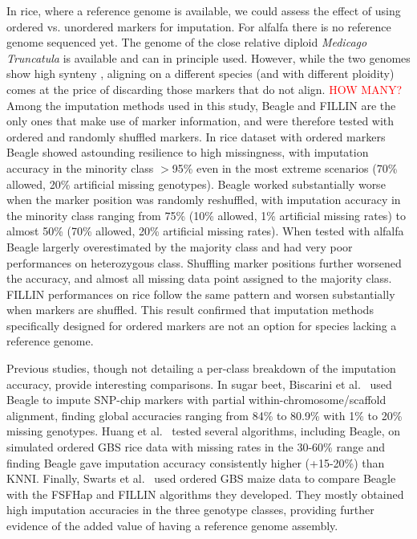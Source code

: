 In rice, where a reference genome is available, we could assess the effect of using ordered vs. unordered markers for imputation. For alfalfa there is no reference genome sequenced yet. The genome of the close relative diploid \emph{Medicago Truncatula} is available \cite{young_medicago_2011} and can in principle used. However, while the two genomes show high synteny \cite{li_saturated_2014}, aligning on a different species (and with different ploidity) comes at the price of discarding those markers that do not align. \textcolor{red}{HOW MANY?}\\

Among the imputation methods used in this study, Beagle and FILLIN are the only ones that make use of marker information, and were therefore tested with ordered and randomly shuffled markers. In rice dataset with ordered markers Beagle showed astounding resilience to high missingness, with imputation accuracy in the minority class $>$95\% even in the most extreme scenarios (70\% allowed, 20\% artificial missing genotypes).
Beagle worked substantially worse when the marker position was randomly reshuffled, with imputation accuracy in the minority class ranging from 75\% (10\% allowed, 1\% artificial missing rates) to almost 50\% (70\% allowed, 20\% artificial missing rates). When tested with alfalfa Beagle largerly overestimated by the majority class and had very poor performances on heterozygous class. Shuffling marker positions further worsened the accuracy, and almost all missing data point assigned to the majority class.\\
FILLIN performances on rice follow the same pattern and worsen substantially when markers are shuffled. This result confirmed that imputation methods specifically designed for ordered markers are not an option for species lacking a reference genome.

Previous studies, though not detailing a per-class breakdown of the imputation accuracy, provide interesting comparisons. In sugar beet, Biscarini et al.~\cite{biscarini_genome-enabled_2014} used Beagle to impute SNP-chip markers with partial within-chromosome/scaffold alignment, finding global accuracies ranging from 84\% to 80.9\% with 1\% to 20\% missing genotypes. Huang et al.~\cite{huang_efficient_2014} tested several algorithms, including Beagle, on simulated ordered GBS rice data with missing rates in the 30-60\% range and finding Beagle gave imputation accuracy consistently higher (+15-20\%) than KNNI. 
Finally, Swarts et al.~\cite{swarts_novel_2014} used ordered GBS maize data to compare Beagle with the FSFHap and FILLIN algorithms they developed. They mostly obtained high imputation accuracies in the three genotype classes, providing further evidence of the added value of having a reference genome assembly.

